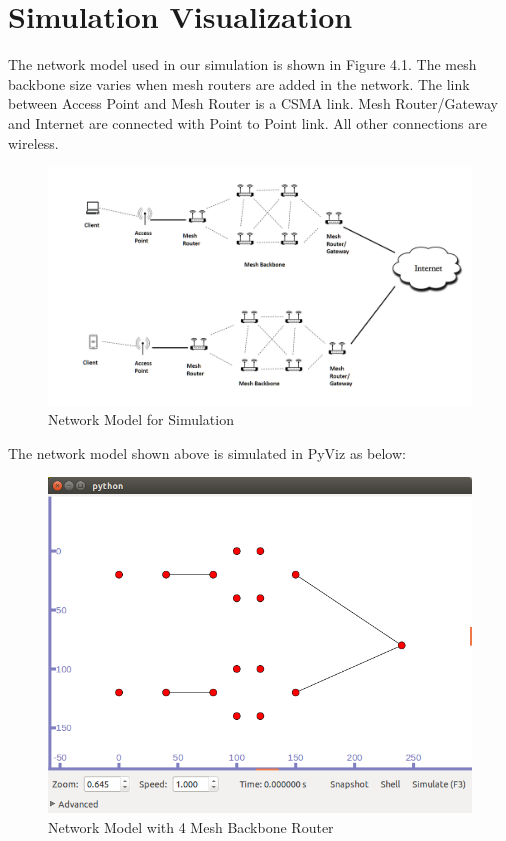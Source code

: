 \documentclass[12pt,a4paper]{report}
\begin{document}
\section{Simulation Visualization}
The network model used in our simulation is shown in Figure 4.1. The mesh backbone size varies when mesh routers are added in the network. The link between Access Point and Mesh Router is a CSMA link. Mesh Router/Gateway and Internet are connected with Point to Point link. All other connections are wireless.
\begin{figure}[hbtp]
\centering
\includegraphics[scale=.5]{Network-Model.png}
\caption{Network Model for Simulation}
\end{figure}
\newpage

The network model shown above is simulated in PyViz as below:
\begin{figure}[hbtp]
\centering
\includegraphics[scale=.4]{mesh-2x2.png}
\caption{Network Model with 4 Mesh Backbone Router}
\end{figure}
\end{document}
